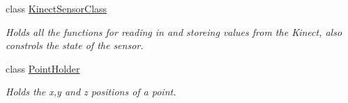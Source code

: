 \begin{DoxyCompactItemize}
class \hyperlink{classkinect_expirement_1_1_kinect_sensor_class}{Kinect\+Sensor\+Class}
\begin{DoxyCompactList}\small\item\em Holds all the functions for reading in and storeing values from the Kinect, also constrols the state of the sensor. \end{DoxyCompactList}\item 
class \hyperlink{classkinect_expirement_1_1_point_holder}{Point\+Holder}
\begin{DoxyCompactList}\small\item\em Holds the x,y and z positions of a point. \end{DoxyCompactList}\end{DoxyCompactItemize}
